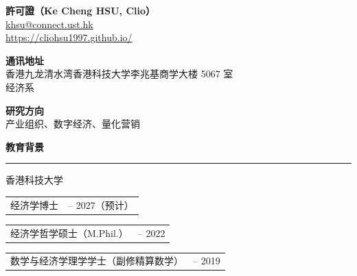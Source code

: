 \documentclass[11pt,letterpaper]{article}
\makeatletter
\newlength{\cvdatecol}
\newcommand{\sectionheader}[1]{%
  \vspace{0.45em}
  {\large\bfseries #1}\\[-0.15em]
  \rule{\textwidth}{0.4pt}\par
  \vspace{0.2em}
}
\newcommand{\cvline}[3][0em]{%
  \par\nobreak
  \noindent\hspace*{#1}%
  \begin{tabularx}{\dimexpr\textwidth-#1\relax}{@{}X@{\hspace{0.75em}}>{\raggedleft\arraybackslash}p{\cvdatecol}@{}}
  #2 & #3 \\
  \end{tabularx}%
}
\makeatother
\begin{document}
\begin{center}
{\LARGE\bfseries 許可證（Ke Cheng HSU, Clio）}\\[0.5em]
\href{mailto:khsu@connect.ust.hk}{khsu@connect.ust.hk}\\[0.15em]
\href{https://cliohsu1997.github.io}{https://cliohsu1997.github.io/}
\end{center}

\vspace{0.45em}

\textbf{通讯地址}\\[0.15em]
\hspace{1.5em} 香港九龙清水湾香港科技大学李兆基商学大楼 5067 室\\
\hspace{1.5em} 经济系

\vspace{0.4em}

\textbf{研究方向}\\[0.15em]
\hspace{1.5em} 产业组织、数字经济、量化营销

\sectionheader{教育背景}
{
香港科技大学\\[-0.3em]
\cvline[1.5em]{经济学博士}{2022 -- 2027（预计）}
\vspace{-0.12em}
\cvline[1.5em]{经济学哲学硕士（M.Phil.）}{2020 -- 2022}
\vspace{-0.12em}
\cvline[1.5em]{数学与经济学理学学士（副修精算数学）}{2015 -- 2019}
}
\end{document}
